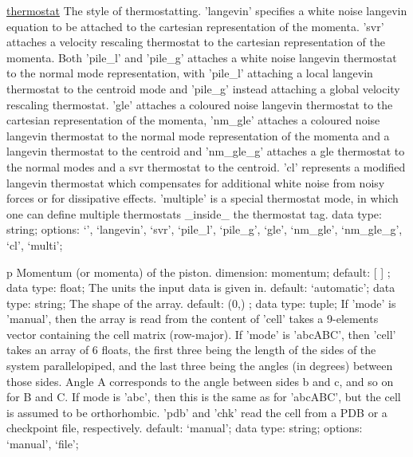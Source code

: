 \begin{ipifield}{}
\begin{ipifield}{\hyperref[THERMOSTATS]{thermostat}}
{}%
{%
{The style of thermostatting. 'langevin' specifies a white noise langevin equation to be attached to the cartesian representation of the momenta. 'svr' attaches a velocity rescaling thermostat to the cartesian representation of the momenta. Both 'pile\_l' and 'pile\_g' attaches a white noise langevin thermostat to the normal mode representation, with 'pile\_l' attaching a local langevin thermostat to the centroid mode and 'pile\_g' instead attaching a global velocity rescaling thermostat. 'gle' attaches a coloured noise langevin thermostat to the cartesian representation of the momenta, 'nm\_gle' attaches a coloured noise langevin thermostat to the normal mode representation of the momenta and a langevin thermostat to the centroid and 'nm\_gle\_g' attaches a gle thermostat to the normal modes and a svr thermostat to the centroid. 'cl' represents a modified langevin thermostat which compensates for additional white noise from noisy forces or for dissipative effects. 'multiple' is a special thermostat mode, in which one can define multiple thermostats \_inside\_ the thermostat tag.}%
{data type: string; options: `', `langevin', `svr', `pile\_l', `pile\_g', `gle', `nm\_gle', `nm\_gle\_g', `cl', `multi'; }%
}
\end{ipifield}
\begin{ipifield}{p}%
{Momentum (or momenta) of the piston.}%
{dimension: momentum; default:  [ ] ; data type: float; }%
{%
{The units the input data is given in.}%
{default: `automatic'; data type: string; }%
%
{The shape of the array.}%
{default:  (0,) ; data type: tuple; }%
%
{If 'mode' is 'manual', then the array is read from the content of 'cell' takes a 9-elements vector containing the cell matrix (row-major). If 'mode' is 'abcABC', then 'cell' takes an array of 6 floats, the first three being the length of the sides of the system parallelopiped, and the last three being the angles (in degrees) between those sides. Angle A corresponds to the angle between sides b and c, and so on for B and C. If mode is 'abc', then this is the same as for 'abcABC', but the cell is assumed to be orthorhombic. 'pdb' and 'chk' read the cell from a PDB or a checkpoint file, respectively.}%
{default: `manual'; data type: string; options: `manual', `file'; }%
}
\end{ipifield}
\end{ipifield}
